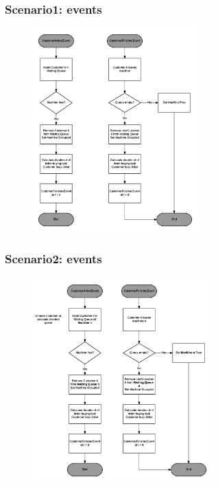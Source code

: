 \documentclass{beamer}
\begin{document}
\begin{frame}
\frametitle{Scenario1: events}
\begin{figure}
\centering
\includegraphics[width=0.57\textwidth]{images/scenario1_diag.png}
\end{figure}
\end{frame}

\begin{frame}
\frametitle{Scenario2: events}
\begin{figure}
\centering
\includegraphics[width=0.62\textwidth]{images/scenario2_diag.png}
\end{figure}
\end{frame}
\end{document}
